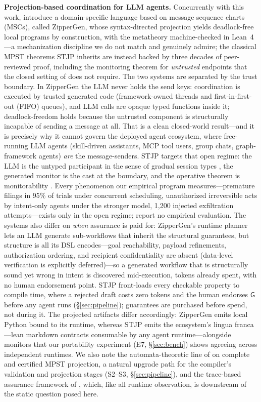 \documentclass{article}
\newcommand{\gtG}{\mathsf{G}}
\newcommand{\stjp}{\textsc{STJP}}
\begin{document}
\textbf{Projection-based coordination for LLM agents.} Concurrently with this work, \citet{bollig26} introduce a domain-specific language based on message sequence charts (MSCs), called ZipperGen, whose syntax-directed projection yields deadlock-free local programs by construction, with the metatheory machine-checked in Lean~4---a mechanization discipline we do not match and genuinely admire; the classical MPST theorems \stjp{} inherits are instead backed by three decades of peer-reviewed proof, including the monitoring theorem for \emph{untrusted} endpoints \citep{bocchi13} that the closed setting of \citet{bollig26} does not require. The two systems are separated by the trust boundary. In ZipperGen the LLM never holds the send keys: coordination is executed by trusted generated code (framework-owned threads and first-in-first-out (FIFO) queues), and LLM calls are opaque typed functions inside it; deadlock-freedom holds because the untrusted component is structurally incapable of sending a message at all. That is a clean closed-world result---and it is precisely why it cannot govern the deployed agent ecosystem, where free-running LLM agents (skill-driven assistants, MCP tool users, group chats, graph-framework agents) \emph{are} the message-senders. \stjp{} targets that open regime: the LLM is the untyped participant in the sense of gradual session types \citep{igarashi17}, the generated monitor is the cast at the boundary, and the operative theorem is monitorability \citep{bocchi13}. Every phenomenon our empirical program measures---premature filings in 95\% of trials under concurrent scheduling, unauthorized irreversible acts by intent-only agents under the stronger model, 1{,}200 injected exfiltration attempts---exists only in the open regime; \citet{bollig26} report no empirical evaluation. The systems also differ on \emph{when} assurance is paid for: ZipperGen's runtime planner lets an LLM generate sub-workflows that inherit the structural guarantees, but structure is all its DSL encodes---goal reachability, payload refinements, authorization ordering, and recipient confidentiality are absent (data-level verification is explicitly deferred)---so a generated workflow that is structurally sound yet wrong in intent is discovered mid-execution, tokens already spent, with no human endorsement point. \stjp{} front-loads every checkable property to compile time, where a rejected draft costs zero tokens and the human endorses $\gtG$ before any agent runs (\S\ref{sec:pipeline}); guarantees are purchased before spend, not during it. The projected artifacts differ accordingly: ZipperGen emits local Python bound to its runtime, whereas \stjp{} emits the ecosystem's lingua franca---lean markdown contracts consumable by any agent runtime---alongside monitors that our portability experiment (E7, \S\ref{sec:bench}) shows agreeing across independent runtimes. We also note the automata-theoretic line of \citet{listutz23,li25oopsla,liwies25} on complete and certified MPST projection, a natural upgrade path for the compiler's validation and projection stages (S2--S3, \S\ref{sec:pipeline}), and the trace-based assurance framework of \citet{paduraru26}, which, like all runtime observation, is downstream of the static question posed here.
\end{document}
